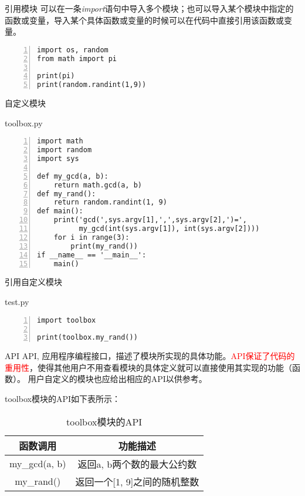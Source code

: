 \documentclass{beamer}
\begin{document}
\begin{frame}[fragile]{引用模块}
可以在一条\textit{import}语句中导入多个模块；也可以导入某个模块中指定的函数或变量，导入某个具体函数或变量的时候可以在代码中直接引用该函数或变量。

\begin{Verbatim}[numbers=left,frame=single,rulecolor=\color{red}]
import os, random
from math import pi

print(pi)
print(random.randint(1,9))
\end{Verbatim}

\end{frame}

\begin{frame}[fragile]{自定义模块}
\begin{block}{toolbox.py}
\begin{Verbatim}[numbers=left,frame=single,rulecolor=\color{red}]
import math
import random
import sys

def my_gcd(a, b):
    return math.gcd(a, b)
def my_rand():
    return random.randint(1, 9)
def main():
    print('gcd(',sys.argv[1],',',sys.argv[2],')=',
          my_gcd(int(sys.argv[1]), int(sys.argv[2])))
    for i in range(3):
        print(my_rand())
if __name__ == '__main__':
    main()
\end{Verbatim}
\end{block}
\end{frame}

\begin{frame}[fragile]{引用自定义模块}
\begin{block}{test.py}
\begin{Verbatim}[numbers=left,frame=single,rulecolor=\color{red}]
import toolbox

print(toolbox.my_rand())
\end{Verbatim}
\end{block}
\end{frame}

\begin{frame}[fragile]{API}
API, 应用程序编程接口，描述了模块所实现的具体功能。\textcolor{red}{API保证了代码的重用性}，使得其他用户不用查看模块的具体定义就可以直接使用其实现的功能（函数）。
用户自定义的模块也应给出相应的API以供参考。

toolbox模块的API如下表所示：
\begin{table}[htp]
\caption{toolbox模块的API}
\begin{center}
\begin{tabular}{c|c}
\toprule
\textbf{函数调用}&\textbf{功能描述}\\
\midrule
my\_gcd(a, b)&返回a, b两个数的最大公约数\\
my\_rand()&返回一个[1, 9]之间的随机整数\\
\bottomrule
\end{tabular}
\end{center}

\end{table}%

\end{frame}
\end{document}
